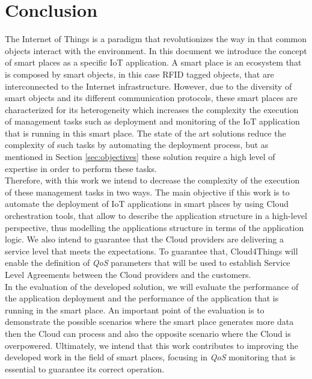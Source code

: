 \section{Conclusion}
\label{sec:conclusion}
The Internet of Things is a paradigm that revolutionizes the way in that common objects
interact with the environment. In this document we introduce the concept of smart
places as a specific IoT application. A smart place is an ecosystem that is composed by smart objects,
in this case RFID tagged objects, that are interconnected to the Internet infrastructure.
However, due to the diversity of smart objects and its different communication
protocols, these smart places are characterized for its heterogeneity which increases the
complexity the execution of management tasks such as deployment and monitoring of the
IoT application that is running in this smart place. The state of the art solutions
reduce the complexity of such tasks by automating the deployment process, but as mentioned
in Section \ref{sec:objectives} these solution require a high level of expertise in
order to perform these tasks.\\

Therefore, with this work we intend to decrease the complexity of the execution of these
management tasks in two ways. The main objective if this work is to automate the deployment
of IoT applications in smart places by using Cloud orchestration tools, that
allow to describe the application structure in a high-level perspective, thus modelling the applications
structure in terms of the application logic. We also intend to guarantee that the Cloud providers
are delivering a service level that meets the expectations. To guarantee that,
Cloud4Things will enable the definition of \textit{QoS} parameters that will be used to
establish Service Level Agreements between the Cloud providers and the customers.\\

In the evaluation of the developed solution, we will evaluate the performance of the
application deployment and the performance of the application that is running in the smart place.
An important point of the evaluation is to demonstrate the possible scenarios where the
smart place generates more data then the Cloud can process and also the opposite scenario where
the Cloud is overpowered. Ultimately, we intend that this work contributes to improving the
developed work in the field of smart places, focusing in \textit{QoS} monitoring that is
essential to guarantee its correct operation.
